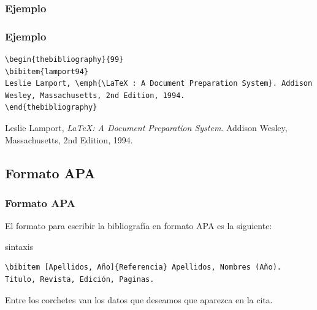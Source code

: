 \documentclass[aspectratio=43]{beamer}%
\begin{document}
\subsubsection{Ejemplo}
\begin{frame}[fragile]
\frametitle{\textbf{Ejemplo}}
\justifying
 \begin{exampleblock}{}
   \vspace{-0.7cm}
\begin{lstlisting}
\begin{thebibliography}{99}
\bibitem{lamport94}
Leslie Lamport, \emph{\LaTeX : A Document Preparation System}. Addison Wesley, Massachusetts, 2nd Edition, 1994.
\end{thebibliography}
\end{lstlisting}\vspace{-0.3cm}

\end{exampleblock}

\begin{block}{}
\begin{thebibliography}{99}
 Leslie Lamport, \emph{\LaTeX : A Document Preparation System}. Addison Wesley, Massachusetts, 2nd Edition, 1994.
\end{thebibliography}
\end{block}


\end{frame}

\subsection{Formato APA}
\begin{frame}[fragile]
\frametitle{\textbf{Formato APA}}
\justifying
 El formato para escribir la bibliografía en formato APA es la siguiente:
\begin{block}{sintaxis}
   \lstset{language=}%
   \vspace{-0.8cm}
\begin{lstlisting}
\bibitem [Apellidos, Año]{Referencia} Apellidos, Nombres (Año). Titulo, Revista, Edición, Paginas.
\end{lstlisting}\vspace{-0.3cm}

\end{block}
Entre los corchetes van los datos que deseamos que aparezca en la cita.
\end{frame}
\end{document}
